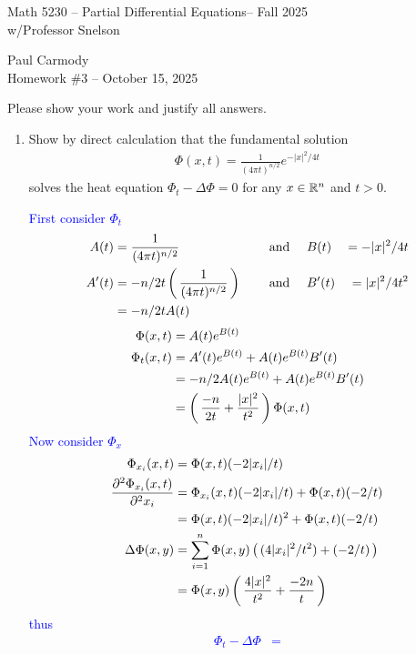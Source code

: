 \documentclass[10pt,a4paper]{report}
\newcommand{\CLASSNAME}{Math 5230 -- Partial Differential Equations}
\newcommand{\STUDENTNAME}{Paul Carmody}
\newcommand{\ASSIGNMENT}{Homework \#3 }
\newcommand{\DUEDATE}{October 15, 2025}
\newcommand{\SEMESTER}{Fall 2025}
\newcommand{\BLUE}[1]{\textcolor{blue}{#1}}
\begin{document}
\begin{center}
	\Large{\CLASSNAME -- \SEMESTER} \\
	\large{ w/Professor Snelson}
\end{center}
\begin{center}
	\STUDENTNAME \\
	\ASSIGNMENT -- \DUEDATE\\
\end{center} 

Please show your work and justify all answers.

\begin{enumerate}
\item Show by direct calculation that the fundamental solution 
\begin{align*}
	\Phi(x,t) = \frac{1}{(4\pi t)^{n/2}}e^{-|x|^2/4t}
\end{align*}solves the heat equation $\Phi_t-\Delta \Phi = 0$ for any $ x \in \mathbb{R}^n$ and $t>0$.

\BLUE{First consider $\Phi_t$\begin{alignat*}{3}
	A(t) &= \frac{1}{(4\pi t)^{n/2}} & \quad \text{ and } & \quad B(t) &= -|x|^2/4t \\
	A'(t) &= -n/2t\left (\, \frac{1}{(4\pi t)^{n/2}} \,\right ) & \quad \text{ and } & \quad 	B'(t) &= |x|^2/4t^2 \\
	&= -n/2t A(t)
\end{alignat*}
\begin{align*}
	\Phi(x,t) &= A(t)e^{B(t)} \\
	\Phi_t(x,t) &= A'(t)e^{B(t)} + A(t)e^{B(t)}B'(t) \\
	&= -n/2 A(t)e^{B(t)}+ A(t)e^{B(t)}B'(t) \\
	&= \left (\, \frac{-n}{2 t} + \frac{|x|^2}{t^2} \,\right )\Phi(x,t)
\end{align*}Now consider $\Phi_x$
\begin{align*}
	\Phi_{x_i}(x,t) &= \Phi(x,t)(-2|x_i|/t) \\
	\frac{\partial^2 \Phi_{x_i}(x,t)}{\partial^2 x_i} &= \Phi_{x_i}(x,t)(-2|x_i|/t) + \Phi(x,t)(-2/t) \\
	&= \Phi(x,t)(-2|x_i|/t)^2+ \Phi(x,t)(-2/t) \\
	\Delta \Phi(x,y) &= \sum_{i=1}^n \Phi(x,y)\left (\, (4|x_i|^2/t^2) + (-2/t) \,\right ) \\
	&= \Phi(x,y)\left (\, \frac{4|x|^2}{t^2} + \frac{-2n}{t} \,\right )
\end{align*}thus
\begin{align*}
	\Phi_t - \Delta \Phi &= 
\end{align*}
}


\end{enumerate}
\end{document}
